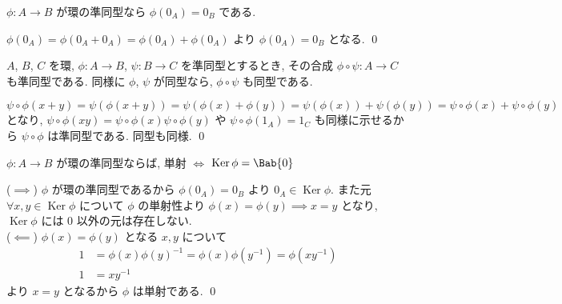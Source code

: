 \documentclass[uplatex,dvipdfmx,a4paper,11pt]{jlreq}
\makeatletter
\DeclareMathOperator{\Kernel}{Ker}
\theoremstyle{definition}
\renewenvironment{proof}[1][\proofname]{\par
  \normalfont
  \topsep6\p@\@plus6\p@ \trivlist
  \item[\hskip\labelsep{\bfseries #1}\@addpunct{\bfseries}]\ignorespaces\quad\par
}{%
  \qed\endtrivlist\@endpefalse
}
\renewcommand\proofname{証明}
\makeatother
\begin{document}
\begin{proposition}
  $\phi:A\to B$ が環の準同型なら $\phi(0_A) = 0_B$ である.
\end{proposition}
\begin{proof}
  $\phi(0_A) = \phi(0_A + 0_A) = \phi(0_A) + \phi(0_A)$ より $\phi(0_A) = 0_B$ となる.
\end{proof}

\begin{proposition}
  $A$, $B$, $C$ を環, $\phi:A\to B$, $\psi:B\to C$ を準同型とするとき, その合成 $\phi\circ\psi:A\to C$ も準同型である. 同様に $\phi$, $\psi$ が同型なら, $\phi\circ\psi$ も同型である.
\end{proposition}
\begin{proof}
  $\psi\circ\phi(x + y) = \psi(\phi(x + y)) = \psi(\phi(x) + \phi(y)) = \psi(\phi(x)) + \psi(\phi(y)) = \psi\circ\phi(x) + \psi\circ\phi(y)$ となり, $\psi\circ\phi(xy) = \psi\circ\phi(x)\psi\circ\phi(y)$ や $\psi\circ\phi(1_A) = 1_C$ も同様に示せるから $\psi\circ\phi$ は準同型である. 同型も同様.
\end{proof}

\begin{proposition}
  $\phi:A\to B$ が環の準同型ならば, 単射 $\iff$ $\Kernel{\phi} = \Bab{0}$
\end{proposition}
\begin{proof}
  ($\implies$) $\phi$ が環の準同型であるから $\phi(0_A) = 0_B$ より $0_A\in\Kernel\phi$. また元 $\forall x, y \in \Kernel\phi$ について $\phi$ の単射性より $\phi(x) = \phi(y) \implies x = y$ となり, $\Kernel\phi$ には $0$ 以外の元は存在しない. \\
  ($\impliedby$) $\phi(x) = \phi(y)$ となる $x, y$ について
  \begin{align}
    1 & = \phi(x)\phi(y)^{-1} = \phi(x)\phi(y^{-1}) = \phi(xy^{-1}) \\
    1 & = xy^{-1}
  \end{align}
  より $x = y$ となるから $\phi$ は単射である.
\end{proof}
\end{document}

